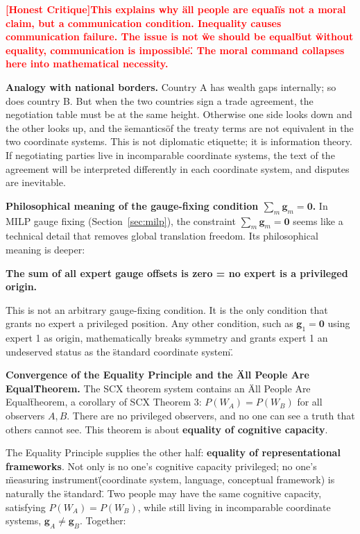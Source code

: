 \documentclass[12pt,a4paper]{article}
\theoremstyle{remark}
\newcommand{\honestcrit}[1]{%
    \textcolor{red}{\textbf{[Honest Critique]#1}}%
}
\begin{document}
\honestcrit{This explains why \"all people are equal\" is not a moral claim, but a \textbf{communication condition}. Inequality causes communication failure. The issue is not \"we should be equal\" but \"without equality, communication is impossible\". The moral command collapses here into mathematical necessity.}

\textbf{Analogy with national borders.} Country A has wealth gaps internally; so does country B. But when the two countries sign a trade agreement, the negotiation table must be at the same height. Otherwise one side looks down and the other looks up, and the \"semantics\" of the treaty terms are not equivalent in the two coordinate systems. This is not diplomatic etiquette; it is information theory. If negotiating parties live in incomparable coordinate systems, the text of the agreement will be interpreted differently in each coordinate system, and disputes are inevitable.

\textbf{Philosophical meaning of the gauge-fixing condition $\sum_m \mathbf{g}_m = \mathbf{0}$.} In MILP gauge fixing (Section~\ref{sec:milp}), the constraint $\sum_m \mathbf{g}_m = \mathbf{0}$ seems like a technical detail that removes global translation freedom. Its philosophical meaning is deeper:
\begin{center}
\textbf{The sum of all expert gauge offsets is zero = no expert is a privileged origin.}
\end{center}
This is not an arbitrary gauge-fixing condition. It is the only condition that grants no expert a privileged position. Any other condition, such as $\mathbf{g}_1 = \mathbf{0}$ using expert 1 as origin, mathematically breaks symmetry and grants expert 1 an undeserved status as the \"standard coordinate system\".

\textbf{Convergence of the Equality Principle and the \"All People Are Equal\" Theorem.} The SCX theorem system contains an \"All People Are Equal\" theorem, a corollary of SCX Theorem 3: $P(W_A) = P(W_B)$ for all observers $A, B$. There are no privileged observers, and no one can see a truth that others cannot see. This theorem is about \textbf{equality of cognitive capacity}.

The Equality Principle supplies the other half: \textbf{equality of representational frameworks}. Not only is no one's cognitive capacity privileged; no one's \"measuring instrument\" (coordinate system, language, conceptual framework) is naturally the \"standard\". Two people may have the same cognitive capacity, satisfying $P(W_A) = P(W_B)$, while still living in incomparable coordinate systems, $\mathbf{g}_A \neq \mathbf{g}_B$. Together:
\end{document}
